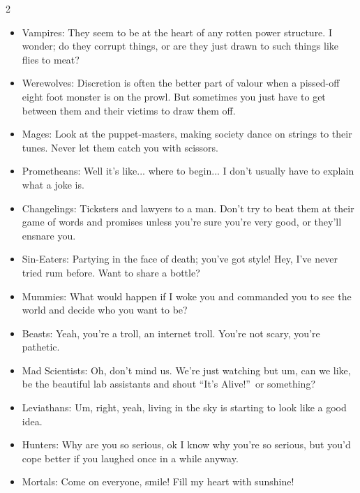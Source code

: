 \begin{multicols}{2}
\begin{itemize}
\item Vampires: They seem to be at the heart of any rotten power structure. I wonder; do they corrupt things, or are they just drawn to such things like flies to meat?
\item Werewolves: Discretion is often the better part of valour when a pissed-off eight foot monster is on the prowl. But sometimes you just have to get between them and their victims to draw them off.
\item Mages: Look at the puppet-masters, making society dance on strings to their tunes. Never let them catch you with scissors.
\item Prometheans: Well it's like... where to begin... I don't usually have to explain what a joke is.
\item Changelings: Ticksters and lawyers to a man. Don’t try to beat them at their game of words and promises unless you’re sure you’re very good, or they’ll ensnare you.
\item Sin-Eaters: Partying in the face of death; you've got style! Hey, I've never tried rum before. Want to share a bottle?
\item Mummies: What would happen if I woke you and commanded you to see the world and decide who you want to be? 
\item Beasts: Yeah, you're a troll, an internet troll. You're not scary, you're pathetic.
\item Mad Scientists: Oh, don't mind us. We're just watching but um, can we like, be the beautiful lab assistants and shout \textquotedblleft It's Alive!\textquotedblright\, or something?
\item Leviathans: Um, right, yeah, living in the sky is starting to look like a good idea.
\item Hunters: Why are you so serious, ok I know why you're so serious, but you'd cope better if you laughed once in a while anyway.
\item Mortals: Come on everyone, smile! Fill my heart with sunshine!

\end{itemize}


\end{multicols}
